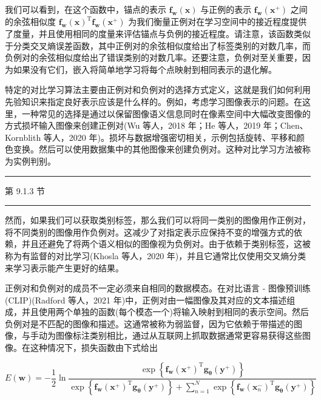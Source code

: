\documentclass[10pt]{article}
\newcommand{\HRule}{\begin{center}\rule{0.9\linewidth}{0.2mm}\end{center}}
\begin{document}
我们可以看到，在这个函数中，锚点的表示 \({\mathbf{f}}_{\mathbf{w}}\left( \mathbf{x}\right)\) 与正例的表示 \({\mathbf{f}}_{\mathbf{w}}\left( {\mathbf{x}}^{ + }\right)\) 之间的余弦相似度 \({\mathbf{f}}_{\mathbf{w}}{\left( \mathbf{x}\right) }^{\mathrm{T}}{\mathbf{f}}_{\mathbf{w}}\left( {\mathbf{x}}^{ + }\right)\) 为我们衡量正例对在学习空间中的接近程度提供了度量，并且使用相同的度量来评估锚点与负例的接近程度。请注意，该函数类似于分类交叉熵误差函数，其中正例对的余弦相似度给出了标签类别的对数几率，而负例对的余弦相似度给出了错误类别的对数几率。还要注意，负例对至关重要，因为如果没有它们，嵌入将简单地学习将每个点映射到相同表示的退化解。

特定的对比学习算法主要由正例对和负例对的选择方式定义，这就是我们如何利用先验知识来指定良好表示应该是什么样的。例如，考虑学习图像表示的问题。在这里，一种常见的选择是通过以保留图像语义信息同时在像素空间中大幅改变图像的方式损坏输入图像来创建正例对(Wu 等人，2018 年；He 等人，2019 年；Chen、Kornblith 等人，2020 年)。损坏与数据增强密切相关，示例包括旋转、平移和颜色变换。然后可以使用数据集中的其他图像来创建负例对。这种对比学习方法被称为实例判别。

\HRule

第 9.1.3 节

\HRule

然而，如果我们可以获取类别标签，那么我们可以将同一类别的图像用作正例对，将不同类别的图像用作负例对。这减少了对指定表示应保持不变的增强方式的依赖，并且还避免了将两个语义相似的图像视为负例对。由于依赖于类别标签，这被称为有监督的对比学习(Khosla 等人，2020 年)，并且它通常比仅使用交叉熵分类来学习表示能产生更好的结果。

正例对和负例对的成员不一定必须来自相同的数据模态。在对比语言 - 图像预训练(CLIP)(Radford 等人，2021 年)中，正例对由一幅图像及其对应的文本描述组成，并且使用两个单独的函数(每个模态一个)将输入映射到相同的表示空间。然后负例对是不匹配的图像和描述。这通常被称为弱监督，因为它依赖于带描述的图像，与手动为图像标注类别相比，通过从互联网上抓取数据通常更容易获得这些图像。在这种情况下，损失函数由下式给出

\[
E\left( \mathbf{w}\right)  =  - \frac{1}{2}\ln \frac{\exp \left\{  {{\mathbf{f}}_{\mathbf{w}}{\left( {\mathbf{x}}^{ + }\right) }^{\mathrm{T}}{\mathbf{g}}_{\mathbf{\theta }}\left( {\mathbf{y}}^{ + }\right) }\right\}  }{\exp \left\{  {{\mathbf{f}}_{\mathbf{w}}{\left( {\mathbf{x}}^{ + }\right) }^{\mathrm{T}}{\mathbf{g}}_{\mathbf{\theta }}\left( {\mathbf{y}}^{ + }\right) }\right\}   + \mathop{\sum }\limits_{{n = 1}}^{N}\exp \left\{  {{\mathbf{f}}_{\mathbf{w}}{\left( {\mathbf{x}}_{n}^{ - }\right) }^{\mathrm{T}}{\mathbf{g}}_{\mathbf{\theta }}\left( {\mathbf{y}}^{ + }\right) }\right\}  }
\]
\end{document}
